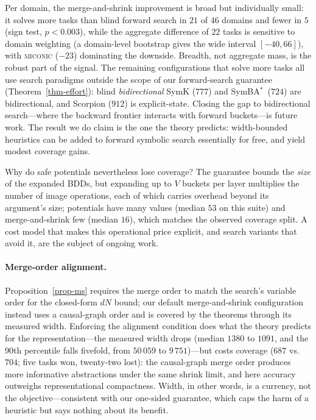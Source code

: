 \documentclass[letterpaper]{article}
\newcommand{\values}{\ensuremath{V}}
\newcommand{\symba}{SymBA\ensuremath{^{*}}}
\theoremstyle{plain}
\theoremstyle{definition}
\theoremstyle{remark}
\begin{document}
Per domain, the merge-and-shrink improvement is broad but individually
small: it solves more tasks than blind forward search in $21$ of $46$
domains and fewer in $5$ (sign test, $p < 0.003$), while the aggregate
difference of $22$ tasks is sensitive to domain weighting (a
domain-level bootstrap gives the wide interval $[-40, 66]$), with
\textsc{miconic} ($-23$) dominating the downside. Breadth, not aggregate
mass, is the robust part of the signal. The remaining configurations that
solve more tasks all use search paradigms outside the scope of our
forward-search guarantee (Theorem~\ref{thm-effort}): blind
\emph{bidirectional} SymK ($777$) and \symba\ ($724$) are bidirectional,
and Scorpion ($912$) is explicit-state. Closing the gap to bidirectional
search---where the backward frontier interacts with forward buckets---is
future work. The result we do claim
is the one the theory predicts: width-bounded heuristics can be added to
forward symbolic search essentially for free, and yield modest coverage
gains.


Why do safe potentials nevertheless lose coverage? The guarantee bounds
the \emph{size} of the expanded BDDs, but expanding up to $\values$
buckets per layer multiplies the number of image operations, each of
which carries overhead beyond its argument's size; potentials have many
values (median $53$ on this suite) and merge-and-shrink few (median
$16$), which matches the observed coverage split. A cost model that
makes this operational price explicit, and search variants that avoid
it, are the subject of ongoing work.
\paragraph{Merge-order alignment.}
Proposition~\ref{prop-ms} requires the merge order to match the search's
variable order for the closed-form $dN$ bound; our default
merge-and-shrink configuration instead uses a causal-graph order and is
covered by the theorems through its measured width. Enforcing the
alignment condition does what the theory predicts for the
representation---the measured width drops (median $1380$ to $1091$, and
the $90$th percentile falls fivefold, from $50\,059$ to
$9\,751$)---but costs coverage ($687$ vs.\ $704$; five tasks won,
twenty-two lost): the causal-graph merge order produces more informative
abstractions under the same shrink limit, and here accuracy outweighs
representational compactness. Width, in other words, is a currency, not
the objective---consistent with our one-sided guarantee, which caps the
harm of a heuristic but says nothing about its benefit.
\end{document}

